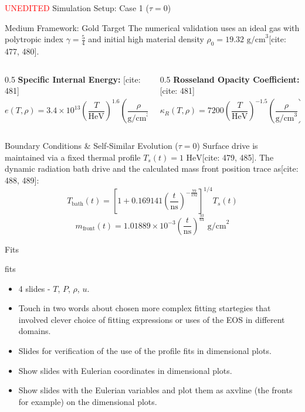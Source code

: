 \documentclass[presentation,10pt]{beamer}
\begin{document}
\begin{frame}{\textcolor{red}{UNEDITED} Simulation Setup: Case 1 ($\tau = 0$)}
  \begin{block}{Medium Framework: Gold Target}
    The numerical validation uses an ideal gas with polytropic index $\gamma = \frac{5}{4}$ and initial high material density $\rho_0 = 19.32\text{ g/cm}^3$[cite: 477, 480].
  \end{block}

  \begin{columns}[t]
    \begin{column}{0.5\textwidth}
      \textbf{Specific Internal Energy:} [cite: 481]
      $$e(T,\rho) = 3.4\times 10^{13} \left(\frac{T}{\text{HeV}}\right)^{1.6} \left(\frac{\rho}{\text{g/cm}^3}\right)^{-0.14}\frac{\text{erg}}{\text{g}}$$
    \end{column}
    \begin{column}{0.5\textwidth}
      \textbf{Rosseland Opacity Coefficient:} [cite: 481]
      $$\kappa_R(T,\rho) = 7200 \left(\frac{T}{\text{HeV}}\right)^{-1.5} \left(\frac{\rho}{\text{g/cm}^3}\right)^{0.2}\frac{\text{cm}^2}{\text{g}}$$
    \end{column}
  \end{columns}

  \vspace{0.3cm}
  \begin{block}{Boundary Conditions \& Self-Similar Evolution ($\tau = 0$)}
    Surface drive is maintained via a fixed thermal profile $T_s(t) = 1\text{ HeV}$[cite: 479, 485]. 
    The dynamic radiation bath drive and the calculated mass front position trace as[cite: 488, 489]:
    $$T_{\text{bath}}(t) = \left[1 + 0.169141 \left(\frac{t}{\text{ns}}\right)^{-\frac{79}{192}}\right]^{1/4} T_s(t)$$ %
    $$m_{\text{front}}(t) = 1.01889\times 10^{-3} \left(\frac{t}{\text{ns}}\right)^{\frac{33}{64}}\text{ g/cm}^2$$ %
  \end{block}
\end{frame}

\begin{frame}{Fits}
  \begin{block}{fits}
    \begin{itemize}
      \item 4 slides - $T$, $P$, $\rho$, $u$.
      \item Touch in two words about chosen more complex fitting startegies that involved clever choice of fitting expressions or uses of the EOS in different domains.
      \item Slides for verification of the use of the profile fits in dimensional plots.
      \item Show slides with Eulerian coordinates in dimensional plots.
      \item Show slides with the Eulerian variables and plot them as axvline (the fronts for example) on the dimensional plots.
    \end{itemize}
  \end{block}
\end{frame}
\end{document}
